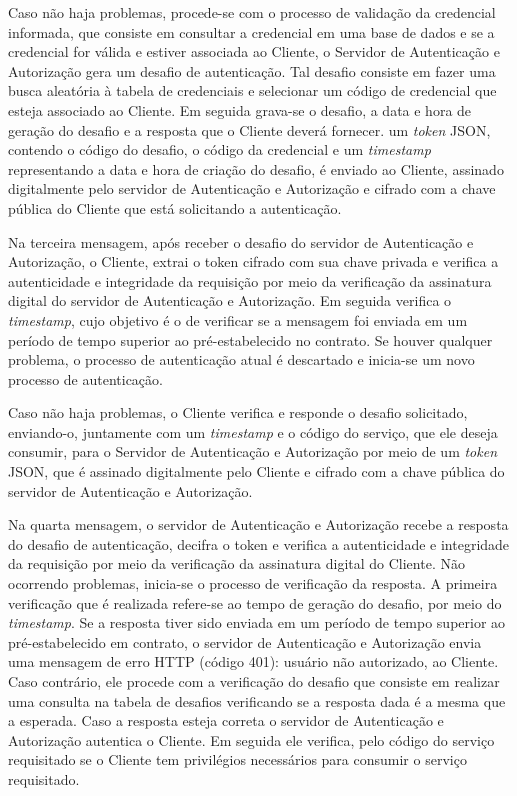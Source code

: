 Caso não haja problemas, procede-se com o processo de validação da credencial informada, que consiste em consultar a credencial em uma base de dados e se a credencial for válida e estiver associada ao Cliente, o Servidor de Autenticação e Autorização gera um desafio de autenticação. Tal desafio consiste em fazer uma busca aleatória à tabela de credenciais e selecionar um código de credencial que esteja associado ao Cliente. Em seguida grava-se o desafio, a data e hora de geração do desafio e a resposta que o Cliente deverá fornecer. um \emph{token} JSON, contendo o código do desafio, o código da credencial e um \emph{timestamp} representando a data e hora de criação do desafio, é enviado ao Cliente, assinado digitalmente pelo servidor de Autenticação e Autorização e cifrado com a chave pública do Cliente que está solicitando a autenticação.

Na terceira mensagem, após receber o desafio do servidor de Autenticação e Autorização, o Cliente, extrai o token cifrado com sua chave privada e verifica a autenticidade e integridade da requisição por meio da verificação da assinatura digital do servidor de Autenticação e Autorização. Em seguida verifica o \emph{timestamp}, cujo objetivo é o de verificar se a mensagem foi enviada em um período de tempo superior ao pré-estabelecido no contrato. Se houver qualquer problema, o processo de autenticação atual é descartado e inicia-se um novo processo de autenticação.

Caso não haja problemas, o Cliente verifica e responde o desafio solicitado, enviando-o, juntamente com um \emph{timestamp} e o código do serviço, que ele deseja consumir, para o Servidor de Autenticação e Autorização por meio de um \emph{token} JSON, que é assinado digitalmente pelo Cliente e cifrado com a chave pública do servidor de Autenticação e Autorização.

Na quarta mensagem, o servidor de Autenticação e Autorização recebe a resposta do desafio de autenticação, decifra o token e verifica a autenticidade e integridade da requisição por meio da verificação da assinatura digital do Cliente.  Não ocorrendo problemas, inicia-se o processo de verificação da resposta. A primeira verificação que é realizada refere-se ao tempo de geração do desafio, por meio do \emph{timestamp}. Se a resposta tiver sido enviada em um período de tempo superior ao pré-estabelecido em contrato, o servidor de Autenticação e Autorização envia uma mensagem de erro HTTP (código 401): usuário não autorizado, ao Cliente. Caso contrário, ele procede com a verificação do desafio que consiste em realizar uma consulta na tabela de desafios verificando se a resposta dada é a mesma que a esperada. Caso a resposta esteja correta o servidor de Autenticação e Autorização autentica o Cliente. Em seguida ele verifica, pelo código do serviço requisitado se o Cliente tem privilégios necessários para consumir o serviço requisitado.

